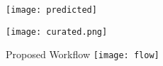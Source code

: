 \begin{frame}[c]{}
    \center
    \texttt{[image: predicted]}
\end{frame}

\begin{frame}[c]{}
    \center
    \texttt{[image: curated.png]}
\end{frame}

\begin{frame}[c]{Proposed Workflow}
    \center
    \texttt{[image: flow]}
\end{frame}



